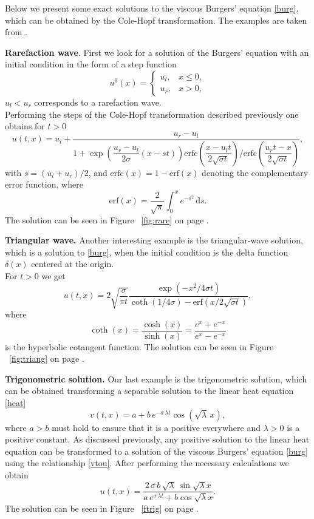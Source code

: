 \documentclass[../include.tex]{subfiles}
\begin{document}
Below we present some exact solutions to the viscous Burgers' equation \eqref{burg}, which can be obtained by the Cole-Hopf transformation. The examples are taken from \cite{olv}.

\textbf{Rarefaction wave}. First we look for a solution of the Burgers' equation with an initial condition in the form of a step function
\begin{equation}
	u^0(x)=
	\begin{cases}
		u_l, &x \leq 0,\nonumber\\
		u_r, &x > 0,\nonumber
	\end{cases}
	\label{rareInit}
\end{equation}
$ u_l < u_r $ corresponds to a rarefaction wave.\\
Performing the steps of the Cole-Hopf transformation described previously one obtains for $ t > 0 $
\begin{equation}
	u(t,x) = u_{l} + \frac{u_{r}-u_{l}}
	{1 + \exp\left(\dfrac{u_r - u_l}{2 \sigma}(x - st)\right)
		\textrm{erfc} \left(\dfrac{x-u_{l}t}{2\sqrt{\sigma t}} \right) 
		\Big/
		\textrm{erfc} \left(\dfrac{u_{r}t-x}{2\sqrt{\sigma t}} \right)},
	\label{rare}
\end{equation}
with $ s = (u_l + u_r)/2 $, and $ \textrm{erfc}(x)  = 1 - \textrm{erf}(x) $ denoting the complementary error function, where
\[
\mathrm{erf}(x) = \frac{2}{\sqrt{\pi}} \int_{0}^{x} e^{-s^2}\,\mathrm{d}s.
\]
The solution can be seen in Figure ~\ref{fig:rare} on page \pageref{fig:rare}.

\textbf{Triangular wave.}
Another interesting example is the triangular-wave solution, which is a solution to \eqref{burg}, when the initial condition is the delta function $ \delta(x) $ centered at the origin.\\
For $ t>0 $ we get
\begin{equation}
	u(t,x)=2 \sqrt{\frac{\sigma}{\pi t}} \frac{\exp\left(-x^{2}/4\sigma t\right)}{\coth \left(1/4\sigma\right)-\mathrm{erf} \left(x/2\sqrt{\sigma t}\right)},
	\label{triang}
\end{equation}
where
\[
\coth (x) = \frac{\cosh(x)}{\sinh(x)} = \frac{e^x + e^{-x}}{e^x - e^{-x}}
\]
is the hyperbolic cotangent function. The solution can be seen in Figure ~\ref{fig:triang} on page \pageref{fig:triang}.

\textbf{Trigonometric solution.}
Our last example is the trigonometric solution, which can be obtained transforming a separable solution to the linear heat equation \eqref{heat}
\[
v(t,x) = a + b\, e^{-\sigma\,\lambda t} \cos(\sqrt{\lambda}\,x),
\]
where $ a > b $ must hold to ensure that it is a positive everywhere and $ \lambda > 0 $ is a positive constant. As discussed previously, any positive solution to the linear heat equation can be transformed to a solution of the viscous Burgers' equation \eqref{burg} using the relationship \eqref{vtou}. After performing the necessary calculations we obtain
\begin{equation}
	u(t,x) = \frac{2\,\sigma\, b\, \sqrt{\lambda} \,\sin{\sqrt{\lambda} x}}{a\,e^{\sigma \,\lambda t}+b\cos \sqrt{\lambda} x }.
	\label{trig}
\end{equation}
The solution can be seen in Figure ~\ref{ftrig} on page \pageref{ftrig}.
\end{document}
